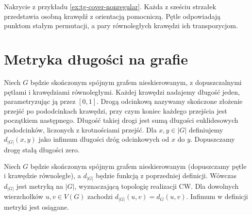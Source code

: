 \begin{center}

{\footnotesize Nakrycie z przykładu \ref{ex:tg-cover-nonregular}.
Każda z sześciu strzałek przedstawia osobną krawędź
z orientacją pomocniczą. Pętle odpowiadają punktom stałym
permutacji, a pary równoległych krawędzi ich transpozycjom.}
\end{center}

\section{Metryka długości na grafie}
\label{sec:tg-metric}

\begin{definicja}
Niech $G$ będzie skończonym spójnym grafem nieskierowanym,
z dopuszczalnymi pętlami i krawędziami równoległymi.
Każdej krawędzi nadajemy długość jeden, parametryzując
ją przez $[0,1]$. Drogą odcinkową nazywamy skończone
złożenie przejść po pododcinkach krawędzi, przy czym
koniec każdego przejścia jest początkiem następnego.
Długość takiej drogi jest sumą długości euklidesowych
pododcinków, liczonych z krotnościami przejść.
Dla $x,y\in|G|$ definiujemy $d_{|G|}(x,y)$ jako infimum
długości dróg odcinkowych od $x$ do $y$.
Dopuszczamy drogę stałą długości zero.
\end{definicja}

\newpage
\begin{stwierdzenie}
\label{prop:tg-length-metric}
Niech $G$ będzie skończonym spójnym grafem nieskierowanym
(dopuszczamy pętle i krawędzie równoległe), a $d_{|G|}$
będzie funkcją z poprzedniej definicji.
Wówczas $d_{|G|}$ jest metryką na $|G|$, wyznaczającą
topologię realizacji CW. Dla dowolnych wierzchołków
$u,v\in V(G)$ zachodzi $d_{|G|}(u,v)=d_G(u,v)$.
Infimum w definicji metryki jest osiągane.
\end{stwierdzenie}

